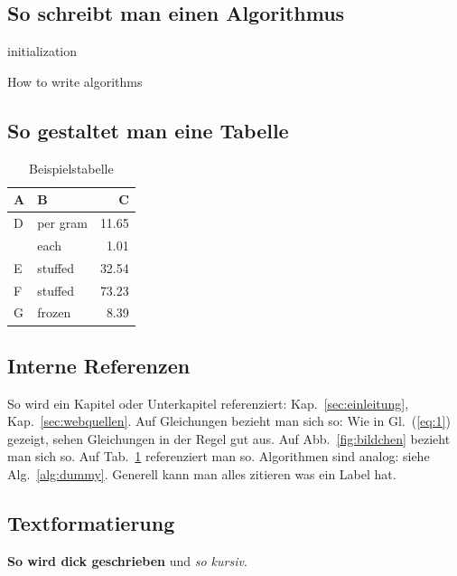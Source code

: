 \documentclass[12pt,oneside]{article}
\begin{document}
\subsection{So schreibt man einen Algorithmus}

\begin{algorithm}[H]
 initialization\;
 \caption{How to write algorithms\label{alg:dummy}
 }
\end{algorithm}

\subsection{So gestaltet man eine Tabelle}

\begin{table}[H]
\caption{Beispielstabelle\label{tab:beispiel}
}
\centering
\begin{tabular}{llr}
\hline
A    & B & C \\
\hline
D      & per gram    & 11.65      \\
          & each        & 1.01       \\
E       & stuffed     & 32.54      \\
F       & stuffed     & 73.23      \\
G & frozen      & 8.39       \\
\hline
\end{tabular}
\end{table}


\subsection{Interne Referenzen}
So wird ein Kapitel oder Unterkapitel referenziert: Kap.~\ref{sec:einleitung},
Kap.~\ref{sec:webquellen}. Auf Gleichungen bezieht man sich so: Wie in Gl.~(\ref{eq:1}) gezeigt,
sehen Gleichungen in der Regel gut aus. Auf Abb.~\ref{fig:bildchen} bezieht man sich so. Auf
Tab.~\ref{tab:beispiel} referenziert man so. Algorithmen sind analog: siehe Alg.~\ref{alg:dummy}.
Generell kann man alles zitieren was ein Label hat.

\subsection{Textformatierung}
\textbf{So wird dick geschrieben} und \textit{so kursiv}.
\end{document}
